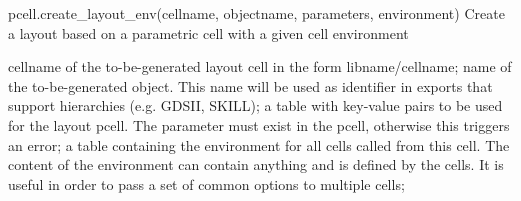 \begin{APIfunc}{pcell.create\_layout\_env(cellname, objectname, parameters, environment)}
    Create a layout based on a parametric cell with a given cell environment
    \begin{APIparameters}
            cellname of the to-be-generated layout cell in the form libname/cellname;
            name of the to-be-generated object. This name will be used as identifier in exports that support hierarchies (e.g. GDSII, SKILL);
            a table with key-value pairs to be used for the layout pcell. The parameter must exist in the pcell, otherwise this triggers an error;
            a table containing the environment for all cells called from this cell. The content of the environment can contain anything and is defined by the cells. It is useful in order to pass a set of common options to multiple cells;
    \end{APIparameters}
\end{APIfunc}
